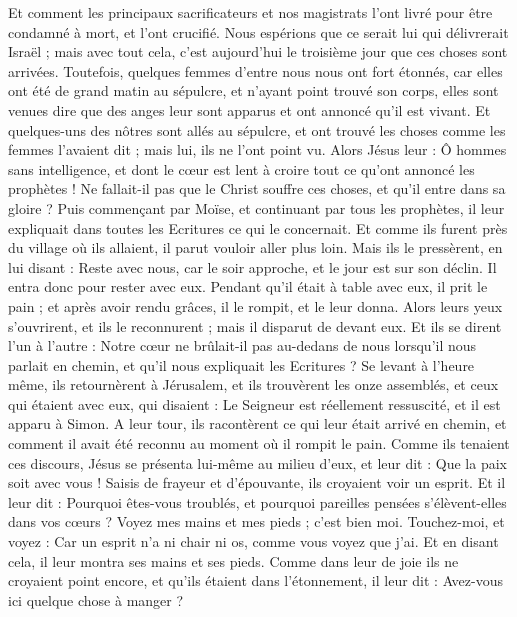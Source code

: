 \begin{multicols}{2}
Et comment les principaux sacrificateurs et nos magistrats l'ont livré pour être condamné à mort, et l'ont crucifié.
Nous espérions que ce serait lui qui délivrerait Israël ; mais avec tout cela, c'est aujourd'hui le troisième jour que ces choses sont arrivées.
Toutefois, quelques femmes d'entre nous nous ont fort étonnés, car elles ont été de grand matin au sépulcre,
et n'ayant point trouvé son corps, elles sont venues dire que des anges leur sont apparus et ont annoncé qu’il est vivant.
Et quelques-uns des nôtres sont allés au sépulcre, et ont trouvé les choses comme les femmes l’avaient dit ; mais lui, ils ne l'ont point vu.
Alors Jésus leur : Ô hommes sans intelligence, et dont le cœur est lent à croire tout ce qu’ont annoncé les prophètes !
Ne fallait-il pas que le Christ souffre ces choses, et qu'il entre dans sa gloire ?
Puis commençant par Moïse, et continuant par tous les prophètes, il leur expliquait dans toutes les Ecritures ce qui le concernait.
Et comme ils furent près du village où ils allaient, il parut vouloir aller plus loin.
Mais ils le pressèrent, en lui disant : Reste avec nous, car le soir approche, et le jour est sur son déclin. Il entra donc pour rester avec eux.
Pendant qu’il était à table avec eux, il prit le pain ; et après avoir rendu grâces, il le rompit, et le leur donna.
Alors leurs yeux s’ouvrirent, et ils le reconnurent ; mais il disparut de devant eux.
Et ils se dirent l’un à l’autre : Notre cœur ne brûlait-il pas au-dedans de nous lorsqu'il nous parlait en chemin, et qu'il nous expliquait les Ecritures ?
Se levant à l’heure même, ils retournèrent à Jérusalem, et ils trouvèrent les onze assemblés, et ceux qui étaient avec eux,
qui disaient : Le Seigneur est réellement ressuscité, et il est apparu à Simon.
A leur tour, ils racontèrent ce qui leur était arrivé en chemin, et comment il avait été reconnu au moment où il rompit le pain.
Comme ils tenaient ces discours, Jésus se présenta lui-même au milieu d'eux, et leur dit : Que la paix soit avec vous !
Saisis de frayeur et d’épouvante, ils croyaient voir un esprit.
Et il leur dit : Pourquoi êtes-vous troublés, et pourquoi pareilles pensées s’élèvent-elles dans vos cœurs ?
Voyez mes mains et mes pieds ; c’est bien moi. Touchez-moi, et voyez : Car un esprit n'a ni chair ni os, comme vous voyez que j'ai.
Et en disant cela, il leur montra ses mains et ses pieds.
Comme dans leur de joie ils ne croyaient point encore, et qu'ils étaient dans l’étonnement, il leur dit : Avez-vous ici quelque chose à manger ?

\end{multicols}
